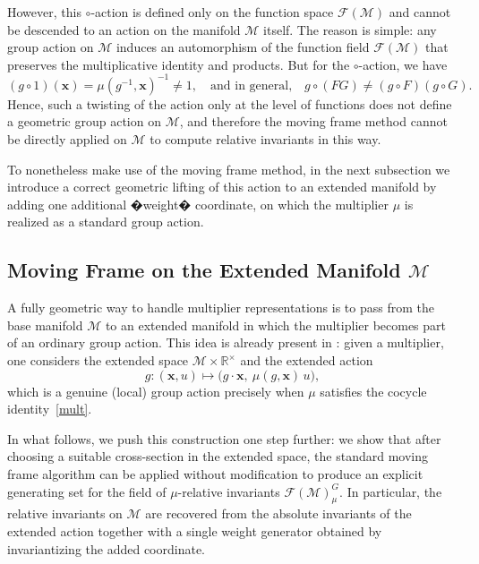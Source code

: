 \documentclass[12pt,reqno]{amsart}
\begin{document}
However, this $\circ$-action is defined only on the function space $\mathcal F(\mathcal M)$ and cannot be descended to an action on the manifold $\mathcal M$ itself. The reason is simple: any group action on $\mathcal M$ induces an automorphism of the function field $\mathcal F(\mathcal M)$ that preserves the multiplicative identity and products. But for the $\circ$-action, we have
$$
(g \circ 1)(\boldsymbol x) = \mu(g^{-1}, \boldsymbol x)^{-1} \neq 1,
\quad\text{and in general,}\quad
g \circ (FG) \neq (g \circ F)(g \circ G).
$$
Hence, such a twisting of the action only at the level of functions does not define a geometric group action on $\mathcal M$, and therefore the moving frame method cannot be directly applied on $\mathcal M$ to compute relative invariants in this way.

To nonetheless make use of the moving frame method, in the next subsection we introduce a correct geometric lifting of this action to an extended manifold by adding one additional �weight� coordinate, on which the multiplier $\mu$ is realized as a standard group action.

\subsection{Moving Frame on the Extended Manifold $\mathcal M$}

A fully geometric way to handle multiplier representations is to pass from the base manifold
\(\mathcal M\) to an {extended} manifold in which the multiplier becomes part of an ordinary group action.
This idea is already present in \cite{Olver1995}: given a multiplier, one considers the extended space
\(\mathcal M \times \mathbb{R}^\times\) and the extended action
\[
g : (\boldsymbol x, u) \longmapsto \bigl(g \cdot \boldsymbol x,\ \mu(g,\boldsymbol x)\,u\bigr),
\]
which is a genuine (local) group action precisely when \(\mu\) satisfies the cocycle identity~\eqref{mult}.

In what follows, we push this construction one step further: we show that after choosing a suitable
cross-section in the extended space, the {standard moving frame algorithm} can be applied without
modification to produce an explicit generating set for the field of \(\mu\)-relative invariants $\mathcal F(\mathcal M)^G_\mu$.
In particular, the relative invariants on \(\mathcal M\) are recovered from the absolute invariants of
the extended action together with a single weight generator obtained by invariantizing the added coordinate.
\end{document}
